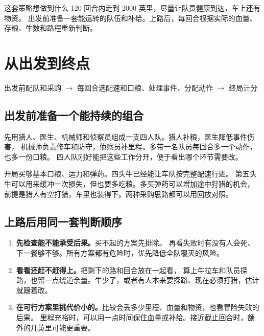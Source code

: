 \documentclass[UTF8,11pt,a4paper]{ctexart}
\begin{document}
\maketitle
\thispagestyle{fancy}

\begin{keybox}{这套策略想做到什么}
120 回合内走到 2000 英里，尽量让队员健康到达，车上还有物资。
出发前准备一套能运转的队伍和补给。上路后，每回合根据实际的血量、存粮、牛数和路程重新判断。
\end{keybox}

\section{从出发到终点}

\begin{center}\small
出发前配队和采购
\quad$\longrightarrow$\quad
每回合选配速和口粮、处理事件、分配动作
\quad$\longrightarrow$\quad
终局计分
\end{center}

\subsection{出发前准备一个能持续的组合}

先用猎人、医生、机械师和侦察员组成一支四人队。猎人补粮，医生降低事件伤害，
机械师负责修车和防守，侦察员补里程。多带一名队员每回合多一个动作，也多一份口粮。
四人队刚好能把这些工作分开，便于看出哪个环节需要改。

开局买够基本口粮、运力和弹药。四头牛已经能让车队按完整配速行进。
第五头牛可以用来缓冲一次损失，但也要多吃粮。多买弹药可以增加途中狩猎的机会，
前提是猎人有空打猎，车里也装得下。两种采购思路都可以用回放对照。

\subsection{上路后用同一套判断顺序}

\begin{enumerate}
  \item \textbf{先检查能不能承受后果。}买不起的方案先排除。
  再看失败时有没有人会死、下一餐够不够。所有方案都有危险时，优先降低全队覆灭的风险。
  \item \textbf{看看还赶不赶得上。}把剩下的路和回合放在一起看，
  算上牛拉车和队员探路，也留一点绕道余量。牛少了，或者有人本来要探路、现在必须打猎，估计就跟着改。
  \item \textbf{在可行方案里挑代价小的。}比较会丢多少里程、血量和物资，也看冒险失败的后果。
  里程充裕时，可以用一点时间保住血量或补给。接近截止回合时，额外的几英里可能更重要。
\end{enumerate}
\end{document}
